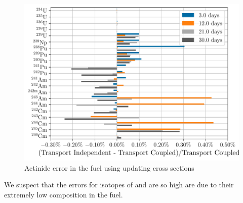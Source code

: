     \begin{figure}[htpb]
        \centering
        \includegraphics[width=\linewidth]{figs/actinides_updating_xs_predictor_fission_q_days.pdf}
        \caption[]{Actinide error in the fuel using updating cross sections}
        \label{fig:actinides-error-updating-xs}
    \end{figure}
    
    We suspect that the errors for isotopes of  and  are so high
    are due to their extremely low composition in the fuel.



